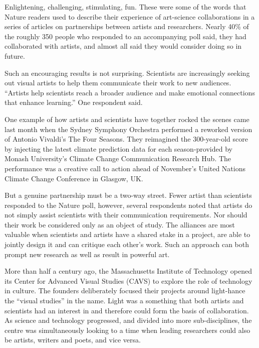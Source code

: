 Enlightening, challenging, stimulating, fun. These were some of the words
that Nature readers used to
describe their experience of art-science collaborations in a series of
articles on partnerships between artists and
researchers. Nearly 40\% of the roughly 350 people who responded to an
accompanying poll said, they had
collaborated with artists, and almost all said they would consider doing
so in future.




Such an encouraging results is not surprising. Scientists are
increasingly seeking out visual artists to help
them communicate their work to new audiences. ``Artists help scientists
reach a broader audience and make
emotional connections that enhance learning.'' One respondent said.



One example of how artists and scientists have together rocked the
scenes came last month when the Sydney
Symphony Orchestra performed a reworked version of Antonio Vivaldi's The
Four Seasons. They reimagined the
300-year-old score by injecting the latest climate prediction data for
each season-provided by Monash University's
Climate Change Communication Research Hub. The performance was a
creative call to action ahead of
November's United Nations Climate Change Conference in Glasgow, UK.




But a genuine partnership must be a two-way street. Fewer artist than
scientists responded to the Nature poll,
however, several respondents noted that artists do not simply assist
scientists with their communication
requirements. Nor should their work be considered only as an object of
study. The alliances are most valuable
when scientists and artists have a shared stake in a project, are able
to jointly design it and can critique each
other's work. Such an approach can both prompt new research as well as
result in powerful art.




More than half a century ago, the Massachusetts Institute of Technology
opened its Center for Advanced
Visual Studies (CAVS) to explore the role of technology in culture. The
founders deliberately focused their
projects around light-hance the ``visual studies'' in the name. Light
was a something that both artists and scientists
had an interest in and therefore could form the basis of collaboration.
As science and technology progressed, and
divided into more sub-disciplines, the centre was simultaneously looking
to a time when leading researchers could
also be artists, writers and poets, and vice versa.



